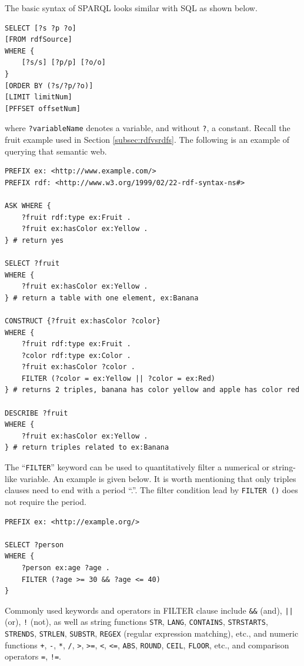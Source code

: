 The basic syntax of SPARQL looks similar with SQL as shown below.
\begin{lstlisting}
SELECT [?s ?p ?o]
[FROM rdfSource]
WHERE {
	[?s/s] [?p/p] [?o/o]
}
[ORDER BY (?s/?p/?o)]
[LIMIT limitNum]
[PFFSET offsetNum]
\end{lstlisting}
where \verb|?variableName| denotes a variable, and without \verb|?|, a constant. Recall the fruit example used in Section \ref{subsec:rdfvsrdfs}. The following is an example of querying that semantic web.
\begin{lstlisting}
PREFIX ex: <http://www.example.com/>
PREFIX rdf: <http://www.w3.org/1999/02/22-rdf-syntax-ns#>

ASK WHERE {
	?fruit rdf:type ex:Fruit .
	?fruit ex:hasColor ex:Yellow .
} # return yes

SELECT ?fruit
WHERE {
	?fruit ex:hasColor ex:Yellow .
} # return a table with one element, ex:Banana

CONSTRUCT {?fruit ex:hasColor ?color}
WHERE {
	?fruit rdf:type ex:Fruit .
	?color rdf:type ex:Color .
	?fruit ex:hasColor ?color .
	FILTER (?color = ex:Yellow || ?color = ex:Red)
} # returns 2 triples, banana has color yellow and apple has color red

DESCRIBE ?fruit
WHERE {
	?fruit ex:hasColor ex:Yellow .
} # return triples related to ex:Banana
\end{lstlisting}

The ``\verb|FILTER|'' keyword can be used to quantitatively filter a numerical or string-like variable. An example is given below. It is worth mentioning that only triples clauses need to end with a period ``.''. The filter condition lead by \verb|FILTER ()| does not require the period.
\begin{lstlisting}
PREFIX ex: <http://example.org/>

SELECT ?person
WHERE {
	?person ex:age ?age .
	FILTER (?age >= 30 && ?age <= 40)
}
\end{lstlisting}
Commonly used keywords and operators in FILTER clause include \verb|&&| (and), \verb$||$ (or), \verb|!| (not), as well as string functions \verb|STR|, \verb|LANG|, \verb|CONTAINS|, \verb|STRSTARTS|, \verb|STRENDS|, \verb|STRLEN|, \verb|SUBSTR|, \verb|REGEX| (regular expression matching), etc., and numeric functions \verb|+|, \verb|-|, \verb|*|, \verb|/|, \verb|>|, \verb|>=|, \verb|<|, \verb|<=|, \verb|ABS|, \verb|ROUND|, \verb|CEIL|, \verb|FLOOR|, etc., and comparison operators \verb|=|, \verb|!=|.

